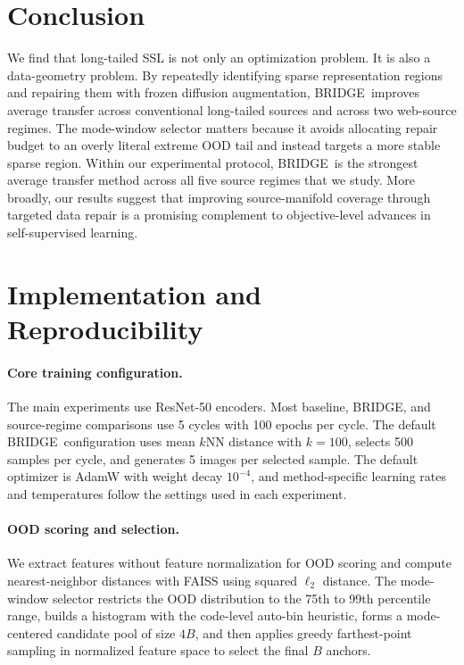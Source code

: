 \documentclass{article}
\newcommand{\method}{BRIDGE}
\begin{document}
\section{Conclusion}
We find that long-tailed SSL is not only an optimization problem. It is also a data-geometry problem. By repeatedly identifying sparse representation regions and repairing them with frozen diffusion augmentation, \method\ improves average transfer across conventional long-tailed sources and across two web-source regimes. The mode-window selector matters because it avoids allocating repair budget to an overly literal extreme OOD tail and instead targets a more stable sparse region. Within our experimental protocol, \method\ is the strongest average transfer method across all five source regimes that we study. More broadly, our results suggest that improving source-manifold coverage through targeted data repair is a promising complement to objective-level advances in self-supervised learning.




\appendix

\section{Implementation and Reproducibility}
\label{app:implementation}
\paragraph{Core training configuration.}
The main experiments use ResNet-50 encoders. Most baseline, \method, and source-regime comparisons use 5 cycles with 100 epochs per cycle. The default \method\ configuration uses mean $k$NN distance with $k = 100$, selects 500 samples per cycle, and generates 5 images per selected sample. The default optimizer is AdamW with weight decay $10^{-4}$, and method-specific learning rates and temperatures follow the settings used in each experiment.

\paragraph{OOD scoring and selection.}
We extract features without feature normalization for OOD scoring and compute nearest-neighbor distances with FAISS using squared $\ell_2$ distance. The mode-window selector restricts the OOD distribution to the 75th to 99th percentile range, builds a histogram with the code-level auto-bin heuristic, forms a mode-centered candidate pool of size $4B$, and then applies greedy farthest-point sampling in normalized feature space to select the final $B$ anchors.
\end{document}
